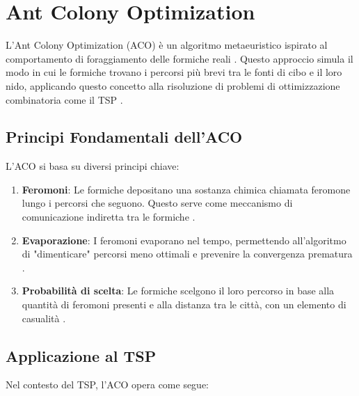 \section{Ant Colony Optimization}

L'Ant Colony Optimization (\gls{ACO}) è un algoritmo metaeuristico ispirato al comportamento di foraggiamento delle formiche reali \cite{dorigo1996ant}. Questo approccio simula il modo in cui le formiche trovano i percorsi più brevi tra le fonti di cibo e il loro nido, applicando questo concetto alla risoluzione di problemi di ottimizzazione combinatoria come il \gls{TSP} \cite{dorigo1997ant}.

\subsection{Principi Fondamentali dell'\gls{ACO}}

L'\gls{ACO} si basa su diversi principi chiave:

\begin{enumerate}
	\item \textbf{Feromoni}: Le formiche depositano una sostanza chimica chiamata feromone lungo i percorsi che seguono. Questo serve come meccanismo di comunicazione indiretta tra le formiche \cite{dorigo2006ant}.
	\item \textbf{Evaporazione}: I feromoni evaporano nel tempo, permettendo all'algoritmo di "dimenticare" percorsi meno ottimali e prevenire la convergenza prematura \cite{stutzle2000max}.
	\item \textbf{Probabilità di scelta}: Le formiche scelgono il loro percorso in base alla quantità di feromoni presenti e alla distanza tra le città, con un elemento di casualità \cite{dorigo2004ant}.
\end{enumerate}

\subsection{Applicazione al \gls{TSP}}

Nel contesto del \gls{TSP}, l'ACO opera come segue:

